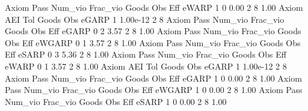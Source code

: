 {\smallskip}
       Axiom {\VBAR} Pass     Num_vio    Frac_vio       Goods         Obs         Eff  
       eWARP {\VBAR}    1           0        0.00           2           8        1.00  
{\smallskip}
       Axiom {\VBAR}       AEI        Tol      Goods        Obs 
       eGARP {\VBAR}         1   1.00e-12          2          8 
{\smallskip}
{\smallskip}
{\smallskip}
       Axiom {\VBAR} Pass     Num_vio    Frac_vio       Goods         Obs         Eff  
       eGARP {\VBAR}    0           2        3.57           2           8        1.00  
{\smallskip}
{\smallskip}
{\smallskip}
       Axiom {\VBAR} Pass     Num_vio    Frac_vio       Goods         Obs         Eff  
      eWGARP {\VBAR}    0           1        3.57           2           8        1.00  
{\smallskip}
{\smallskip}
{\smallskip}
       Axiom {\VBAR} Pass     Num_vio    Frac_vio       Goods         Obs         Eff  
       eSARP {\VBAR}    0           3        5.36           2           8        1.00  
{\smallskip}
{\smallskip}
{\smallskip}
       Axiom {\VBAR} Pass     Num_vio    Frac_vio       Goods         Obs         Eff  
       eWARP {\VBAR}    0           1        3.57           2           8        1.00  
{\smallskip}
       Axiom {\VBAR}       AEI        Tol      Goods        Obs 
       eGARP {\VBAR}         1   1.00e-12          2          8 
{\smallskip}
{\smallskip}
{\smallskip}
       Axiom {\VBAR} Pass     Num_vio    Frac_vio       Goods         Obs         Eff  
       eGARP {\VBAR}    1           0        0.00           2           8        1.00  
{\smallskip}
{\smallskip}
{\smallskip}
       Axiom {\VBAR} Pass     Num_vio    Frac_vio       Goods         Obs         Eff  
      eWGARP {\VBAR}    1           0        0.00           2           8        1.00  
{\smallskip}
{\smallskip}
{\smallskip}
       Axiom {\VBAR} Pass     Num_vio    Frac_vio       Goods         Obs         Eff  
       eSARP {\VBAR}    1           0        0.00           2           8        1.00  
